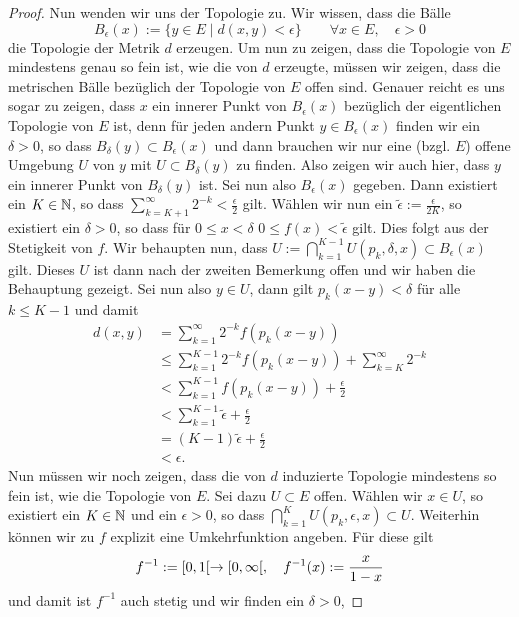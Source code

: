 \begin{proof}
  Nun wenden wir uns der Topologie zu. Wir wissen, dass die Bälle
  \[
  B_\epsilon(x) := \{ y \in E \mid d(x,y) < \epsilon \} \qquad \forall
  x \in E, \quad \epsilon > 0
  \]
  die Topologie der Metrik $d$ erzeugen. Um nun zu zeigen, dass die
  Topologie von $E$ mindestens genau so fein ist, wie die von $d$
  erzeugte, müssen wir zeigen, dass die metrischen Bälle bezüglich der
  Topologie von $E$ offen sind. Genauer reicht es uns sogar
  zu zeigen, dass $x$ ein innerer Punkt von $B_\epsilon(x)$ bezüglich
  der eigentlichen Topologie von $E$ ist, denn
  für jeden andern Punkt $y \in B_\epsilon(x)$ finden wir ein
  $\delta >0$, so dass $B_\delta(y) \subset B_\epsilon(x)$ und dann
  brauchen wir nur eine (bzgl. $E$) offene Umgebung $U$ von $y$ mit $U
  \subset B_\delta(y)$ zu finden. Also zeigen wir auch hier, dass $y$
  ein innerer Punkt von $B_\delta(y)$ ist. Sei nun also
  $B_\epsilon(x)$ gegeben. Dann existiert ein $K \in \mathbb{N}$, so dass
  $\sum_{k=K+1}^\infty 2^{-k} < \frac{\epsilon}{2}$ gilt. Wählen wir
  nun ein $\tilde \epsilon := \frac{\epsilon}{2K}$, so  existiert ein
  $\delta > 0$, so dass für $0 \leq x < \delta$ $0 \leq f(x) < \tilde \epsilon$
  gilt. Dies folgt aus der Stetigkeit von $f$. Wir behaupten nun, dass
  $U := \bigcap_{k=1}^{K-1} U(p_k, \delta, x) \subset B_\epsilon(x)$
  gilt. Dieses $U$ ist dann nach der zweiten Bemerkung offen und wir
  haben die Behauptung gezeigt. Sei nun also $y \in U$, dann gilt
  $p_k(x-y) < \delta$ für alle $k \leq K-1$ und damit
  \begin{align*}
    d(x,y) & = \sum_{k=1}^\infty 2^{-k} f(p_k(x-y)) \\
    & \leq \sum_{k=1}^{K-1}2^{-k} f(p_k(x-y)) + \sum_{k=K}^\infty 2^{-k} \\
    & < \sum_{k=1}^{K-1} f(p_k(x-y)) + \frac{\epsilon}{2} \\
    & < \sum_{k=1}^{K-1} \tilde \epsilon + \frac{\epsilon}{2} \\
    & = (K-1) \tilde \epsilon + \frac{\epsilon}{2}\\
    & < \epsilon.
  \end{align*}
  Nun müssen wir noch zeigen, dass die von $d$ induzierte Topologie
  mindestens so fein ist, wie die Topologie von $E$. Sei dazu $U \subset
  E$ offen. Wählen wir $x \in U$, so existiert ein $K \in \mathbb{N}$ und ein
  $\epsilon > 0$, so dass $\bigcap_{k=1}^K U(p_k, \epsilon, x) \subset
  U$. Weiterhin können wir zu $f$ explizit eine Umkehrfunktion
  angeben. Für diese gilt
  \[
  f^{-1} := [0, 1[\rightarrow [0, \infty[, \quad f^{-1}(x) := \frac{x}{1-x}
  \]
  und damit ist $f^{-1}$ auch stetig und wir finden ein $\delta > 0$,

\end{proof}

